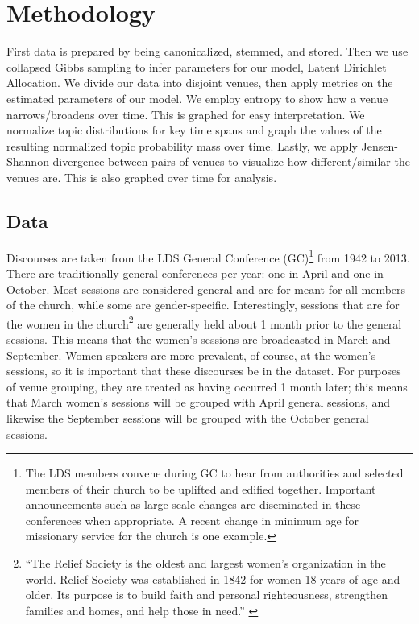 \section {Methodology}
First data is prepared by being canonicalized, stemmed, and stored. Then we use collapsed Gibbs sampling to infer parameters for our model, Latent Dirichlet Allocation. We divide our data into disjoint venues, then apply metrics on the estimated parameters of our model. We employ entropy to show how a venue narrows/broadens over time. This is graphed for easy interpretation. We normalize topic distributions for key time spans and graph the values of the resulting normalized topic probability mass over time. Lastly, we apply Jensen-Shannon divergence between pairs of venues to visualize how different/similar the venues are. This is also graphed over time for analysis.

\subsection{Data}
Discourses are taken from the LDS %
General Conference (GC)\footnote{The LDS members convene during GC to hear from authorities and selected members of their church to be uplifted and edified together. Important announcements such as large-scale changes are diseminated in these conferences when appropriate. A recent change in minimum age for missionary service for the church is one example.} from 1942 to 2013. There are traditionally general conferences per year: one in April and one in October. Most sessions are considered general and are for meant for all members of the church, while some are gender-specific. Interestingly, sessions that are for the women in the church\footnote{``The Relief Society is the oldest and largest women's organization in the world. Relief Society was established in 1842 for women 18 years of age and older. Its purpose is to build faith and personal righteousness, strengthen families and homes, and help those in need.'' \cite{mormon.org-rs}} are generally held about 1 month prior to the general sessions. This means that the women's sessions are broadcasted in March and September. Women speakers are more prevalent, of course, at the women's sessions, so it is important that these discourses be in the dataset. For purposes of venue grouping, they are treated as having occurred 1 month later; this means that March women's sessions will be grouped with April general sessions, and likewise the September sessions will be grouped with the October general sessions. 

